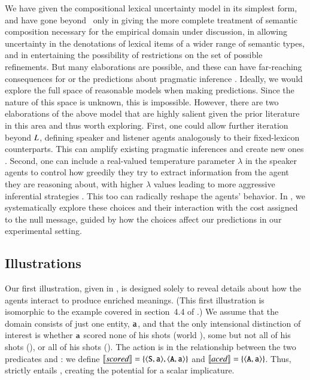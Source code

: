 \documentclass[leqno,12pt]{article}
\begin{document}
We have given the compositional lexical uncertainty model in its
simplest form, and have gone beyond
\citeauthor{Bergen:Levy:Goodman:2014}\ only in giving the more
complete treatment of semantic composition necessary for the empirical
domain under discussion, in allowing uncertainty in the denotations of
lexical items of a wider range of semantic types, and in entertaining
the possibility of restrictions on the set of possible refinements.
But many elaborations are possible, and these can have far-reaching
consequences for or the predictions about pragmatic inference
\citep{Goodman:Lassiter:2013, Smith:Goodman:Frank:2013,
  Kao-etal:2014,Potts:Levy:2015}. Ideally, we would explore the full
space of reasonable models when making predictions. Since the nature
of this space is unknown, this is impossible. However, there are two
elaborations of the above model that are highly salient given the
prior literature in this area and thus worth exploring. First, one
could allow further iteration beyond $L$, defining
speaker and listener agents analogously to their fixed-lexicon
counterparts. This can amplify existing pragmatic inferences and
create new ones
\citep{Bergen:Levy:Goodman:2014,Vogel-etal:2014,Potts:Levy:2015}.
Second, one can include a real-valued temperature parameter $\lambda$
in the speaker agents to control how greedily they try to extract
information from the agent they are reasoning about, with higher
$\lambda$ values leading to more aggressive inferential strategies
\citep{Sutton:Barto:1998}. This too can radically reshape the agents'
behavior.  In , we systematically
explore these choices and their interaction with the cost assigned to
the null message, guided by how the choices affect our predictions in
our experimental setting.



\subsection{Illustrations}\label{sec:illustrations}

Our first illustration, given in , is
designed solely to reveal details about how the agents interact to
produce enriched meanings. (This first illustration is isomorphic to
the example covered in section~4.4 of
\citealp{Bergen:Levy:Goodman:2014}.) We assume that the domain
consists of just one entity, $\texttt{a}$, and that the only intensional
distinction of interest is whether $\texttt{a}$ scored none of his shots
(world ), some but not all of his shots (), or all
of his shots (). The action is in the relationship between
the two predicates  and : we define
$\llbracket\emph{scored\/}\rrbracket = \left\{ \langle \texttt{S}, \texttt{a} \rangle,
  \langle \texttt{A}, \texttt{a} \rangle \right\}$ and $\llbracket\emph{aced\/}\rrbracket =
\left\{ \langle \texttt{A}, \texttt{a} \rangle \right\}$. Thus,  strictly entails
, creating the potential for a scalar implicature.
\end{document}
